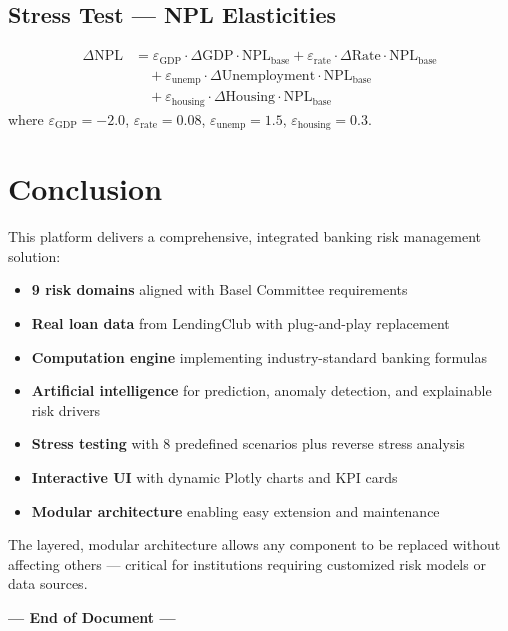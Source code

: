 \documentclass[12pt,a4paper]{article}
\begin{document}
\subsection{Stress Test — NPL Elasticities}
\begin{align*}
\Delta\text{NPL} &= \varepsilon_{\text{GDP}} \cdot \Delta\text{GDP} \cdot \text{NPL}_{\text{base}}
                  + \varepsilon_{\text{rate}} \cdot \Delta\text{Rate} \cdot \text{NPL}_{\text{base}} \\
                &\quad + \varepsilon_{\text{unemp}} \cdot \Delta\text{Unemployment} \cdot \text{NPL}_{\text{base}} \\
                &\quad + \varepsilon_{\text{housing}} \cdot \Delta\text{Housing} \cdot \text{NPL}_{\text{base}}
\end{align*}
where $\varepsilon_{\text{GDP}} = -2.0$, $\varepsilon_{\text{rate}} = 0.08$, $\varepsilon_{\text{unemp}} = 1.5$, $\varepsilon_{\text{housing}} = 0.3$.

\section{Conclusion}

This platform delivers a comprehensive, integrated banking risk management solution:

\begin{itemize}[itemsep=3pt]
    \item \textbf{9 risk domains} aligned with Basel Committee requirements
    \item \textbf{Real loan data} from LendingClub with plug-and-play replacement
    \item \textbf{Computation engine} implementing industry-standard banking formulas
    \item \textbf{Artificial intelligence} for prediction, anomaly detection, and explainable risk drivers
    \item \textbf{Stress testing} with 8 predefined scenarios plus reverse stress analysis
    \item \textbf{Interactive UI} with dynamic Plotly charts and KPI cards
    \item \textbf{Modular architecture} enabling easy extension and maintenance
\end{itemize}

The layered, modular architecture allows any component to be replaced without affecting others — critical for institutions requiring customized risk models or data sources.

\vspace{1cm}
\begin{center}
{\Large\bfseries --- End of Document ---}
\end{center}
\end{document}

